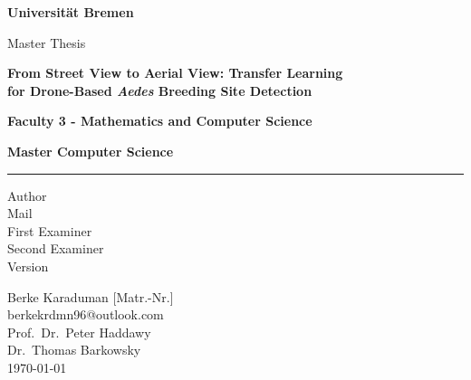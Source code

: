 
\begin{titlepage}
\thispagestyle{empty}
\begin{center}

\vspace*{0.8cm}
{\huge\bfseries Universität Bremen\par}

\vspace{1.6cm}
{\Large Master Thesis\par}

\vspace{2cm}

{\LARGE\bfseries
From Street View to Aerial View: Transfer Learning\\
for Drone-Based \textit{Aedes} Breeding Site Detection
\par}

\vspace{1.5cm}

{\Large\bfseries Faculty 3 - Mathematics and Computer Science\par}
\vspace{0.2cm}
{\Large\bfseries Master Computer Science\par}

\vspace{1.2cm}
{\color{red}\rule{0.92\textwidth}{2pt}}

\end{center}

\vspace{1.8cm}

\noindent
\begin{minipage}[t]{0.46\textwidth}
\raggedright
Author\\
Mail\\[1.2em]
First Examiner\\
Second Examiner\\[4.5em]
Version
\end{minipage}%
\begin{minipage}[t]{0.54\textwidth}
\raggedright
Berke Karaduman [Matr.-Nr.]\\
berkekrdmn96@outlook.com\\[1.2em]
Prof.\ Dr.\ Peter Haddawy\\
Dr.\ Thomas Barkowsky\\[4.5em]
\today
\end{minipage}

\end{titlepage}
